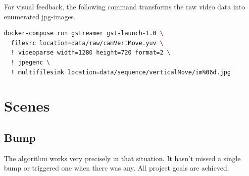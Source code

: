 For visual feedback, the following command transforms the raw video data into enumerated jpg-images.

\begin{lstlisting}[language=bash]
docker-compose run gstreamer gst-launch-1.0 \
  filesrc location=data/raw/camVertMove.yuv \
  ! videoparse width=1280 height=720 format=2 \
  ! jpegenc \
  ! multifilesink location=data/sequence/verticalMove/im%06d.jpg
\end{lstlisting}

\section{Scenes}
\subsection{Bump}
The algorithm works very precisely in that situation. It hasn't missed a single bump or triggered one when there was any. All project goals are achieved.


